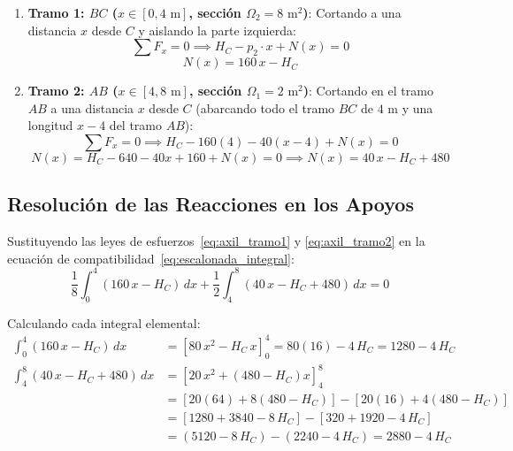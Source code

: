 \begin{enumerate}
    \item \textbf{Tramo 1: $BC$ ($x \in [0, 4\text{ m}]$, sección $\Omega_2 = 8\text{ m}^2$)}:
    Cortando a una distancia $x$ desde $C$ y aislando la parte izquierda:
    \begin{equation}
        \sum F_x = 0 \implies H_C - p_2 \cdot x + N(x) = 0
    \end{equation}
    \begin{equation}
        N(x) = 160\,x - H_C \label{eq:axil_tramo1}
    \end{equation}

    \item \textbf{Tramo 2: $AB$ ($x \in [4, 8\text{ m}]$, sección $\Omega_1 = 2\text{ m}^2$)}:
    Cortando en el tramo $AB$ a una distancia $x$ desde $C$ (abarcando todo el tramo $BC$ de $4\text{ m}$ y una longitud $x - 4$ del tramo $AB$):
    \begin{equation}
        \sum F_x = 0 \implies H_C - 160(4) - 40(x - 4) + N(x) = 0
    \end{equation}
    \begin{equation}
        N(x) = H_C - 640 - 40x + 160 + N(x) = 0 \implies N(x) = 40\,x - H_C + 480 \label{eq:axil_tramo2}
    \end{equation}
\end{enumerate}

\subsection{Resolución de las Reacciones en los Apoyos}

Sustituyendo las leyes de esfuerzos~\eqref{eq:axil_tramo1} y \eqref{eq:axil_tramo2} en la ecuación de compatibilidad~\eqref{eq:escalonada_integral}:
\begin{equation}
    \frac{1}{8} \int_{0}^{4} (160\,x - H_C)\,dx + \frac{1}{2} \int_{4}^{8} (40\,x - H_C + 480)\,dx = 0
\end{equation}

Calculando cada integral elemental:
\begin{align}
    \int_{0}^{4} (160\,x - H_C)\,dx &= \left[ 80\,x^2 - H_C\,x \right]_0^4 = 80(16) - 4\,H_C = 1280 - 4\,H_C \\[6pt]
    \int_{4}^{8} (40\,x - H_C + 480)\,dx &= \left[ 20\,x^2 + (480 - H_C)x \right]_4^8 \nonumber \\
    &= \left[ 20(64) + 8(480 - H_C) \right] - \left[ 20(16) + 4(480 - H_C) \right] \nonumber \\
    &= \left[ 1280 + 3840 - 8\,H_C \right] - \left[ 320 + 1920 - 4\,H_C \right] \nonumber \\
    &= (5120 - 8\,H_C) - (2240 - 4\,H_C) = 2880 - 4\,H_C
\end{align}

